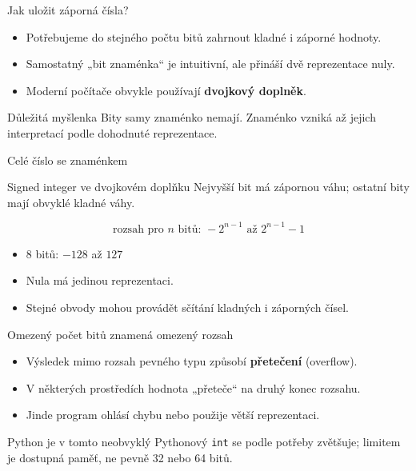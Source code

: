 \documentclass[aspectratio=169]{beamer}
\newcommand{\term}[1]{\textcolor{CodeBlue}{\textbf{#1}}}
\begin{document}
\begin{frame}{Jak uložit záporná čísla?}
  \begin{itemize}
    \item Potřebujeme do stejného počtu bitů zahrnout kladné i záporné hodnoty.
    \item Samostatný „bit znaménka“ je intuitivní, ale přináší dvě reprezentace nuly.
    \item Moderní počítače obvykle používají \term{dvojkový doplněk}.
  \end{itemize}
  \begin{block}{Důležitá myšlenka}
    Bity samy znaménko nemají. Znaménko vzniká až jejich interpretací podle dohodnuté reprezentace.
  \end{block}
\end{frame}

\begin{frame}{Celé číslo se znaménkem}
  \begin{block}{Signed integer ve dvojkovém doplňku}
    Nejvyšší bit má zápornou váhu; ostatní bity mají obvyklé kladné váhy.
  \end{block}
  \[
    \text{rozsah pro } n \text{ bitů: } -2^{n-1} \text{ až } 2^{n-1}-1
  \]
  \begin{itemize}
    \item 8 bitů: $-128$ až $127$
    \item Nula má jedinou reprezentaci.
    \item Stejné obvody mohou provádět sčítání kladných i záporných čísel.
  \end{itemize}
\end{frame}

\begin{frame}{Omezený počet bitů znamená omezený rozsah}
  \begin{itemize}
    \item Výsledek mimo rozsah pevného typu způsobí \term{přetečení} (overflow).
    \item V některých prostředích hodnota „přeteče“ na druhý konec rozsahu.
    \item Jinde program ohlásí chybu nebo použije větší reprezentaci.
  \end{itemize}
  \begin{alertblock}{Python je v tomto neobvyklý}
    Pythonový \texttt{int} se podle potřeby zvětšuje; limitem je dostupná paměť, ne pevně 32 nebo 64 bitů.
  \end{alertblock}
\end{frame}
\end{document}

